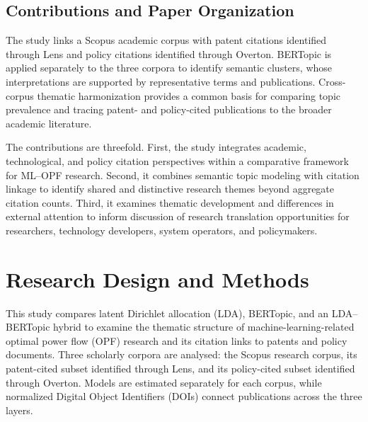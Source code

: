 \documentclass[a4paper,fleqn]{cas-sc}
\begin{document}
\subsection{Contributions and Paper Organization}
\label{sec:contributions_outline}

The study links a Scopus academic corpus with patent citations identified through Lens and policy citations identified through Overton. BERTopic is applied separately to the three corpora to identify semantic clusters, whose interpretations are supported by representative terms and publications. Cross-corpus thematic harmonization provides a common basis for comparing topic prevalence and tracing patent- and policy-cited publications to the broader academic literature.

The contributions are threefold. First, the study integrates academic, technological, and policy citation perspectives within a comparative framework for ML--OPF research. Second, it combines semantic topic modeling with citation linkage to identify shared and distinctive research themes beyond aggregate citation counts. Third, it examines thematic development and differences in external attention to inform discussion of research translation opportunities for researchers, technology developers, system operators, and policymakers.


\section{Research Design and Methods}\label{sec:methodology}

This study compares latent Dirichlet allocation (LDA), BERTopic, and an LDA--BERTopic hybrid to examine the thematic structure of machine-learning-related optimal power flow (OPF) research and its citation links to patents and policy documents. Three scholarly corpora are analysed: the Scopus research corpus, its patent-cited subset identified through Lens, and its policy-cited subset identified through Overton. Models are estimated separately for each corpus, while normalized Digital Object Identifiers (DOIs) connect publications across the three layers.
\end{document}
